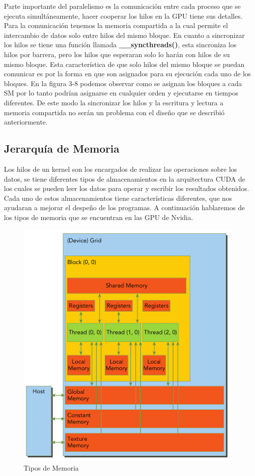 Parte importante del paralelismo es la comunicación entre cada proceso que se ejecuta simultáneamente, hacer cooperar los hilos en la GPU tiene sus detalles. Para la comunicación tenemos la memoria compartida a la cual permite el intercambio de datos solo entre hilos del mismo bloque. En cuanto a sincronizar los hilos se tiene una función llamada \textbf{\_\_syncthreads()}, esta sincroniza los hilos por barrera, pero los hilos que esperaran solo lo harán con hilos de su mismo bloque. Esta característica de que solo hilos del mismo bloque se puedan comunicar es por la forma en que son asignados para su ejecución cada uno de los bloques. En la figura 3-8 podemos observar como se asignan los bloques a cada SM por lo tanto podrían asignarse en cualquier orden y ejecutarse en tiempos diferentes. De este modo la sincronizar los hilos y la escritura y lectura a memoria compartida no serán un problema con el diseño que se describió anteriormente.




\subsection{Jerarquía de Memoria}


Los hilos de un kernel son los encargados de realizar las operaciones sobre los datos, se tiene diferentes tipos de almacenamientos en la arquitectura CUDA de los cuales se pueden leer los datos para operar y escribir los resultados obtenidos. Cada uno de estos almacenamientos tiene características diferentes, que nos ayudaran a mejorar el despeño de los programas. A continuación hablaremos de los tipos de memoria que se encuentran en las GPU de Nvidia.

\begin{figure}[h]
			\centering
				\includegraphics[scale=0.6]{img/memoria.jpg}
			\caption{Tipos de Memoria}
\end{figure}

